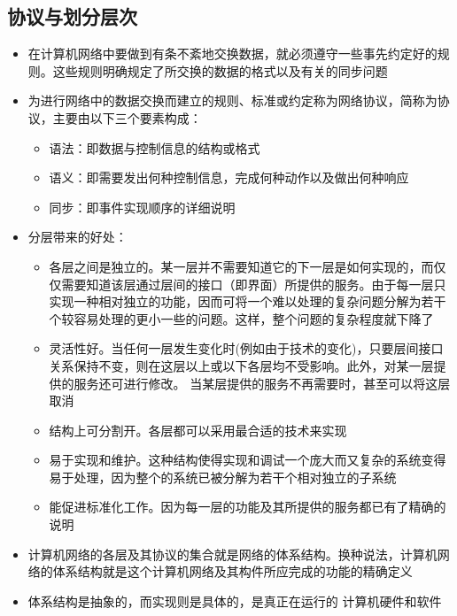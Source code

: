 \documentclass[cs4size,a4paper,10pt]{ctexart}
\begin{document}
	\subsection{协议与划分层次}
	\begin{itemize}
		\item 在计算机网络中要做到有条不紊地交换数据，就必须遵守一些事先约定好的规则。这些规则明确规定了所交换的数据的格式以及有关的同步问题
		\item 为进行网络中的数据交换而建立的规则、标准或约定称为网络协议，简称为协议，主要由以下三个要素构成：
		\begin{itemize}
			\item 语法：即数据与控制信息的结构或格式
			\item 语义：即需要发出何种控制信息，完成何种动作以及做出何种响应
			\item 同步：即事件实现顺序的详细说明
		\end{itemize}
		\item 分层带来的好处：
		\begin{itemize}
			\item 各层之间是独立的。某一层并不需要知道它的下一层是如何实现的，而仅仅需要知道该层通过层间的接口（即界面）所提供的服务。由于每一层只实现一种相对独立的功能，因而可将一个难以处理的复杂问题分解为若干个较容易处理的更小一些的问题。这样，整个问题的复杂程度就下降了
			\item 灵活性好。当任何一层发生变化时(例如由于技术的变化)，只要层间接口关系保持不变，则在这层以上或以下各层均不受影响。此外，对某一层提供的服务还可进行修改。 当某层提供的服务不再需要时，甚至可以将这层取消
			\item 结构上可分割开。各层都可以采用最合适的技术来实现
			\item 易于实现和维护。这种结构使得实现和调试一个庞大而又复杂的系统变得易于处理，因为整个的系统已被分解为若干个相对独立的子系统
			\item 能促进标准化工作。因为每一层的功能及其所提供的服务都已有了精确的说明
		\end{itemize}
		\item 计算机网络的各层及其协议的集合就是网络的体系结构。换种说法，计算机网络的体系结构就是这个计算机网络及其构件所应完成的功能的精确定义
		\item 体系结构是抽象的，而实现则是具体的，是真正在运行的 计算机硬件和软件
	\end{itemize}
\end{document}
